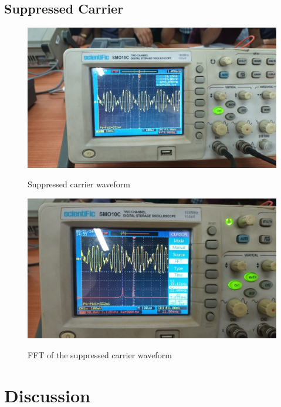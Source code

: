 \documentclass{article}
\begin{document}
\subsection{Suppressed Carrier}
\begin{figure}[!ht]
  \caption{Suppressed carrier waveform}
\includegraphics[width=\textwidth]{DSB_SC.jpeg}
\label{fig:DSB_SC}
\end{figure}
\begin{figure}[!ht]
  \caption{FFT of the suppressed carrier waveform}
\includegraphics[width=\textwidth]{DSB_SC_FFT.jpeg}
\label{fig:DSB_SC_FFT}
\end{figure}
\clearpage
 \section{Discussion}
\end{document}
